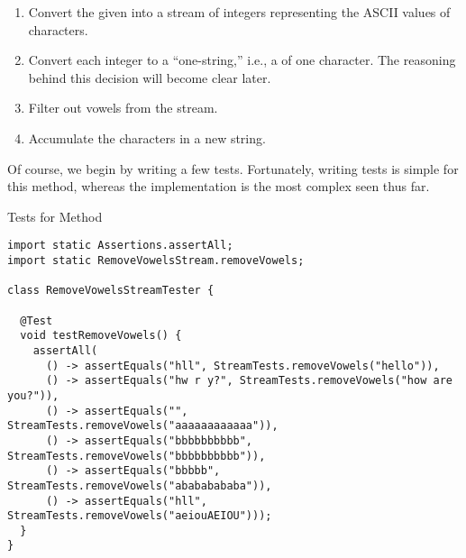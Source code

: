 \begin{enumerate}
    \item Convert the given  into a stream of integers representing the ASCII values of characters.
    \item Convert each integer to a ``one-string,'' i.e., a  of one character. The reasoning behind this decision will become clear later.
    \item Filter out vowels from the stream.
    \item Accumulate the characters in a new string.
\end{enumerate}

Of course, we begin by writing a few tests. Fortunately, writing tests is simple for this method, whereas the implementation is the most complex seen thus far.

\begin{cl}[]{Tests for  Method}
\begin{lstlisting}[language=MyJava]
import static Assertions.assertAll;
import static RemoveVowelsStream.removeVowels;

class RemoveVowelsStreamTester {
  
  @Test
  void testRemoveVowels() {
    assertAll(
      () -> assertEquals("hll", StreamTests.removeVowels("hello")),
      () -> assertEquals("hw r y?", StreamTests.removeVowels("how are you?")),
      () -> assertEquals("", StreamTests.removeVowels("aaaaaaaaaaaa")),
      () -> assertEquals("bbbbbbbbbb", StreamTests.removeVowels("bbbbbbbbbb")),
      () -> assertEquals("bbbbb", StreamTests.removeVowels("abababababa")),
      () -> assertEquals("hll", StreamTests.removeVowels("aeiouAEIOU")));
  }
}
\end{lstlisting}
\end{cl}


